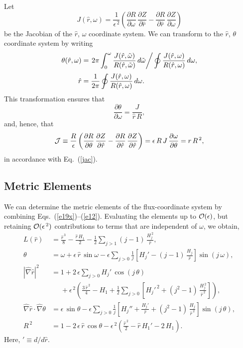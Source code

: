 \documentclass[12pt,prb,aps]{revtex4-1}
\begin{document}
Let
\begin{equation}
J(\hat{r},\omega) = \frac{1}{\epsilon^{\,2}}\left(\frac{\partial R}{\partial\omega}\,\frac{\partial Z}{\partial \hat{r}} -\frac{\partial R}{\partial \hat{r}}\,\frac{\partial Z}{\partial \omega}\right)
\end{equation}
be the Jacobian of the $\hat{r}$, $\omega$ coordinate system. We can transform to the $\hat{r}$, $\theta$ coordinate system 
by writing
\begin{align}\label{e11}
\theta(\hat{r},\omega) &= \left.2\pi\int_0^\omega \frac{J(\hat{r},\tilde{\omega})}{R(\hat{r},\tilde{\omega})}\,d\tilde{\omega}\right/\oint\frac{J(\hat{r},\omega)}{R(\hat{r},\omega)}\,d\omega,\\[0.5ex]
\hat{r}&=\frac{1}{2\pi}\oint\frac{J(\hat{r},\omega)}{R(\hat{r},\omega)}\,d\omega.\label{e12}
\end{align}
This transformation ensures that 
\begin{equation}
\frac{\partial\theta}{\partial\omega} = \frac{J}{\hat{r}\,R},
\end{equation}
and, hence, that 
\begin{equation}
{\cal J} \equiv \frac{R}{\epsilon} \left(\frac{\partial R}{\partial\theta}\,\frac{\partial Z}{\partial \hat{r}} -\frac{\partial R}{\partial \hat{r}}\,\frac{\partial Z}{\partial \hat{r}}\right)
=\epsilon\, R\,J\,\frac{\partial\omega}{\partial\theta} =r\,R^{\,2},
\end{equation}
in accordance with Eq.~(\ref{jac}). 

\subsection{Metric Elements}\label{metric}
We can determine the metric elements of the flux-coordinate system by combining Eqs.~(\ref{e19x})--(\ref{e12}).
Evaluating the elements up to ${\cal O}(\epsilon)$, but retaining ${\cal O}(\epsilon^{\,2})$ contributions to terms that are independent of
$\omega$, we obtain,\cite{tj,tj1}
\begin{align}\label{epdef}
L(\hat{r})&= \frac{\hat{r}^{\,3}}{8} -\frac{\hat{r}\,H_1}{2}-\frac{1}{2}\sum_{j>1}(j-1)\,\frac{H_j^{\,2}}{\hat{r}},\\[0.5ex]
\theta &= \omega+\epsilon\,\hat{r}\,\sin\omega - \epsilon\sum_{j>0}\frac{1}{j}\left[H_j'-(j-1)\,\frac{H_j}{\hat{r}}\right]\sin(j\,\omega),\label{e22y}\\[0.5ex]
|\hat{\nabla} \hat{r}|^2 &= 1 +2\,\epsilon\sum_{j>0}H_j'\,\cos(j\,\theta)  \nonumber\\[0.5ex]
&\phantom{=}+\epsilon^{\,2}\left(\frac{3\,\hat{r}^{\,2}}{4}-H_1+
\frac{1}{2}\sum_{j>0}\left[H_j'^{\,2}+(j^2-1)\,\frac{H_j^{\,2}}{\hat{r}^{\,2}}\right]\right),\label{e19}\\[0.5ex]
\hat{\nabla}\hat{r}\cdot\hat{\nabla}\theta&=\epsilon\,\sin\theta
-\epsilon\sum_{j>0}\frac{1}{j}\left[H_j''+\frac{H_j'}{\hat{r}}+(j^2-1)\,\frac{H_j}{\hat{r}^{\,2}}\right]\sin(j\,\theta),\label{e20uu}
\\[0.5ex]
R^{\,2}&= 1-2\,\epsilon\,\hat{r}\,\cos\theta -\epsilon^{\,2}\left(\frac{\hat{r}^{\,2}}{2}-\hat{r}\,H_1'-2\,H_1\right).\label{e25a}
\end{align}
Here, $'\equiv d/d\hat{r}$.
\end{document}

